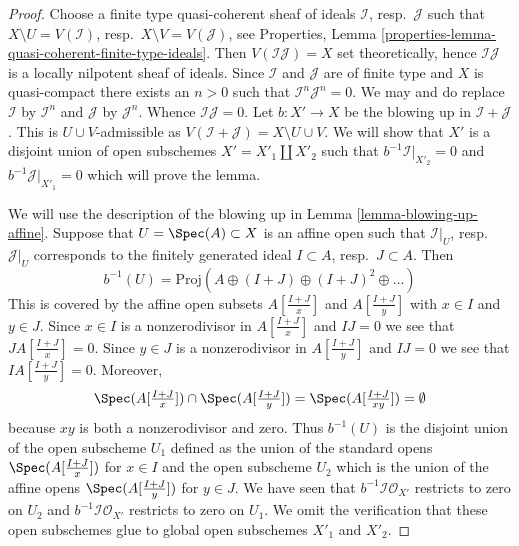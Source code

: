 \begin{proof}
Choose a finite type quasi-coherent sheaf of ideals $\mathcal{I}$,
resp.\ $\mathcal{J}$ such that $X \setminus U = V(\mathcal{I})$,
resp.\ $X \setminus V = V(\mathcal{J})$, see
Properties, Lemma \ref{properties-lemma-quasi-coherent-finite-type-ideals}.
Then $V(\mathcal{I}\mathcal{J}) = X$ set theoretically, hence
$\mathcal{I}\mathcal{J}$ is a locally nilpotent sheaf of ideals.
Since $\mathcal{I}$ and $\mathcal{J}$ are of finite type and $X$
is quasi-compact there exists an $n > 0$ such that
$\mathcal{I}^n \mathcal{J}^n = 0$. We may and do replace $\mathcal{I}$
by $\mathcal{I}^n$ and $\mathcal{J}$ by $\mathcal{J}^n$. Whence
$\mathcal{I} \mathcal{J} = 0$. Let $b : X' \to X$ be the blowing
up in $\mathcal{I} + \mathcal{J}$. This is $U \cup V$-admissible
as $V(\mathcal{I} + \mathcal{J}) = X \setminus U \cup V$. We will show that
$X'$ is a disjoint union of open subschemes $X' = X'_1 \amalg X'_2$
such that $b^{-1}\mathcal{I}|_{X'_2} = 0$ and $b^{-1}\mathcal{J}|_{X'_1} = 0$
which will prove the lemma.

\medskip\noindent
We will use the description of the blowing up in
Lemma \ref{lemma-blowing-up-affine}. Suppose that $U = \Spec(A) \subset X$
is an affine open such that $\mathcal{I}|_U$, resp.\ $\mathcal{J}|_U$
corresponds to the finitely generated ideal $I \subset A$, resp.\ $J \subset A$.
Then
$$
b^{-1}(U) = \text{Proj}(A \oplus (I + J) \oplus (I + J)^2 \oplus \ldots)
$$
This is covered by the affine open subsets $A[\frac{I + J}{x}]$
and $A[\frac{I + J}{y}]$ with $x \in I$ and $y \in J$. Since $x \in I$ is a
nonzerodivisor in $A[\frac{I + J}{x}]$ and $IJ = 0$ we see that
$J A[\frac{I + J}{x}] = 0$. Since $y \in J$ is a nonzerodivisor
in $A[\frac{I + J}{y}]$ and $IJ = 0$ we see that
$I A[\frac{I + J}{y}] = 0$. Moreover,
$$
\Spec(A[\textstyle{\frac{I + J}{x}}]) \cap
\Spec(A[\textstyle{\frac{I + J}{y}}]) =
\Spec(A[\textstyle{\frac{I + J}{xy}}]) = \emptyset
$$
because $xy$ is both a nonzerodivisor and zero. Thus $b^{-1}(U)$
is the disjoint union of the open subscheme $U_1$ defined as the union
of the standard opens $\Spec(A[\frac{I + J}{x}])$ for $x \in I$ and the open
subscheme $U_2$ which is the union of the affine opens
$\Spec(A[\frac{I + J}{y}])$ for $y \in J$. We have seen that
$b^{-1}\mathcal{I}\mathcal{O}_{X'}$ restricts to zero on $U_2$
and $b^{-1}\mathcal{I}\mathcal{O}_{X'}$ restricts to zero on $U_1$.
We omit the verification that these open subschemes glue to global
open subschemes $X'_1$ and $X'_2$.
\end{proof}

